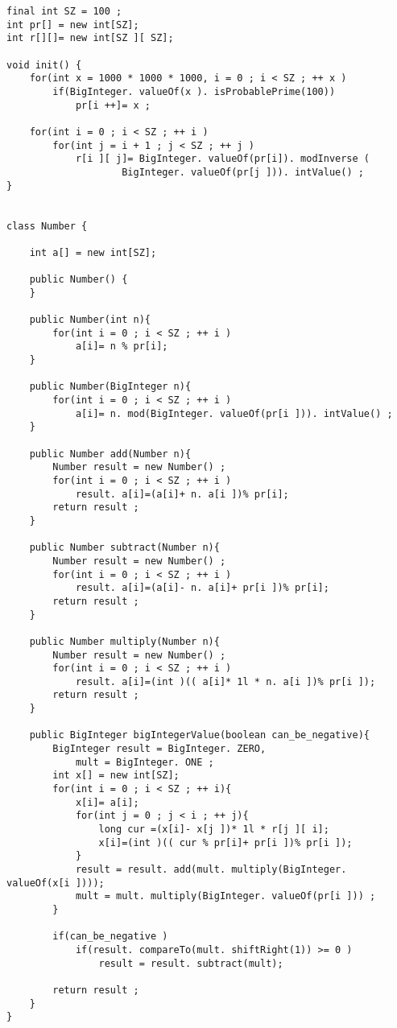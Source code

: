 \begin{verbatim}
final int SZ = 100 ;
int pr[] = new int[SZ];
int r[][]= new int[SZ ][ SZ];
 
void init() {
    for(int x = 1000 * 1000 * 1000, i = 0 ; i < SZ ; ++ x )
        if(BigInteger. valueOf(x ). isProbablePrime(100))
            pr[i ++]= x ;
 
    for(int i = 0 ; i < SZ ; ++ i )
        for(int j = i + 1 ; j < SZ ; ++ j )
            r[i ][ j]= BigInteger. valueOf(pr[i]). modInverse (
                    BigInteger. valueOf(pr[j ])). intValue() ;
}
 
 
class Number {
 
    int a[] = new int[SZ];
 
    public Number() {
    }
 
    public Number(int n){
        for(int i = 0 ; i < SZ ; ++ i )
            a[i]= n % pr[i];
    }
 
    public Number(BigInteger n){
        for(int i = 0 ; i < SZ ; ++ i )
            a[i]= n. mod(BigInteger. valueOf(pr[i ])). intValue() ;
    }
 
    public Number add(Number n){
        Number result = new Number() ;
        for(int i = 0 ; i < SZ ; ++ i )
            result. a[i]=(a[i]+ n. a[i ])% pr[i];
        return result ;
    }
 
    public Number subtract(Number n){
        Number result = new Number() ;
        for(int i = 0 ; i < SZ ; ++ i )
            result. a[i]=(a[i]- n. a[i]+ pr[i ])% pr[i];
        return result ;
    }
 
    public Number multiply(Number n){
        Number result = new Number() ;
        for(int i = 0 ; i < SZ ; ++ i )
            result. a[i]=(int )(( a[i]* 1l * n. a[i ])% pr[i ]);
        return result ;
    }
 
    public BigInteger bigIntegerValue(boolean can_be_negative){
        BigInteger result = BigInteger. ZERO,
            mult = BigInteger. ONE ;
        int x[] = new int[SZ];
        for(int i = 0 ; i < SZ ; ++ i){
            x[i]= a[i];
            for(int j = 0 ; j < i ; ++ j){
                long cur =(x[i]- x[j ])* 1l * r[j ][ i];
                x[i]=(int )(( cur % pr[i]+ pr[i ])% pr[i ]);                    
            }
            result = result. add(mult. multiply(BigInteger. valueOf(x[i ])));
            mult = mult. multiply(BigInteger. valueOf(pr[i ])) ;
        }
 
        if(can_be_negative )
            if(result. compareTo(mult. shiftRight(1)) >= 0 )
                result = result. subtract(mult);
 
        return result ;
    }
} 
\end{verbatim}

